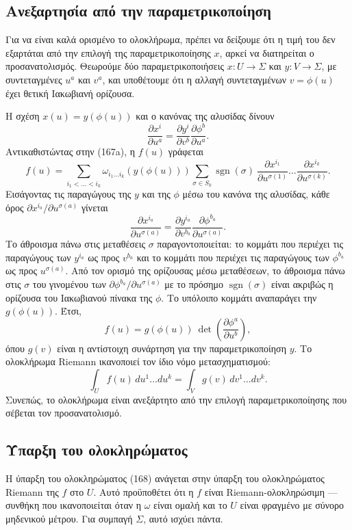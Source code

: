 \documentclass[12pt]{article}
\begin{document}
\subsection{Ανεξαρτησία από την παραμετρικοποίηση}

Για να είναι καλά ορισμένο το ολοκλήρωμα, πρέπει να δείξουμε ότι η τιμή του δεν εξαρτάται από την επιλογή της παραμετρικοποίησης $x$, αρκεί να διατηρείται ο προσανατολισμός. Θεωρούμε δύο παραμετρικοποιήσεις $x: U \to \Sigma$ και $y: V \to \Sigma$, με συντεταγμένες $u^a$ και $v^a$, και υποθέτουμε ότι η αλλαγή συντεταγμένων $v = \phi(u)$ έχει θετική Ιακωβιανή ορίζουσα.

Η σχέση $x(u) = y(\phi(u))$ και ο κανόνας της αλυσίδας δίνουν
\[
\frac{\partial x^i}{\partial u^a} = \frac{\partial y^i}{\partial v^b} \frac{\partial \phi^b}{\partial u^a}.
\]
Αντικαθιστώντας στην (167a), η $f(u)$ γράφεται
\[
f(u) = \sum_{i_1 < \dots < i_k} \omega_{i_1 \dots i_k}(y(\phi(u))) \sum_{\sigma \in S_k} \operatorname{sgn}(\sigma) \ \frac{\partial x^{i_1}}{\partial u^{\sigma(1)}} \dots \frac{\partial x^{i_k}}{\partial u^{\sigma(k)}}.
\]
Εισάγοντας τις παραγώγους της $y$ και της $\phi$ μέσω του κανόνα της αλυσίδας, κάθε όρος $\partial x^{i_a} / \partial u^{\sigma(a)}$ γίνεται
\[
\frac{\partial x^{i_a}}{\partial u^{\sigma(a)}} = \frac{\partial y^{i_a}}{\partial v^{b_a}} \frac{\partial \phi^{b_a}}{\partial u^{\sigma(a)}}.
\]
Το άθροισμα πάνω στις μεταθέσεις $\sigma$ παραγοντοποιείται: το κομμάτι που περιέχει τις παραγώγους των $y^{i_a}$ ως προς $v^{b_a}$ και το κομμάτι που περιέχει τις παραγώγους των $\phi^{b_a}$ ως προς $u^{\sigma(a)}$. Από τον ορισμό της ορίζουσας μέσω μεταθέσεων, το άθροισμα πάνω στις $\sigma$ του γινομένου των $\partial \phi^{b_a} / \partial u^{\sigma(a)}$ με το πρόσημο $\operatorname{sgn}(\sigma)$ είναι ακριβώς η ορίζουσα του Ιακωβιανού πίνακα της $\phi$. Το υπόλοιπο κομμάτι αναπαράγει την $g(\phi(u))$. Έτσι,
\[
f(u) = g(\phi(u)) \ \det \left( \frac{\partial \phi^a}{\partial u^b} \right),
\]
όπου $g(v)$ είναι η αντίστοιχη συνάρτηση για την παραμετρικοποίηση $y$. Το ολοκλήρωμα Riemann ικανοποιεί τον ίδιο νόμο μετασχηματισμού:
\[
\int_U f(u) \, du^1 \dots du^k = \int_V g(v) \, dv^1 \dots dv^k.
\]
Συνεπώς, το ολοκλήρωμα είναι ανεξάρτητο από την επιλογή παραμετρικοποίησης που σέβεται τον προσανατολισμό.

\subsection{Ύπαρξη του ολοκληρώματος}

Η ύπαρξη του ολοκληρώματος (168) ανάγεται στην ύπαρξη του ολοκληρώματος Riemann της $f$ στο $U$. Αυτό προϋποθέτει ότι η $f$ είναι Riemann-ολοκληρώσιμη — συνθήκη που ικανοποιείται όταν η $\omega$ είναι ομαλή και το $U$ είναι φραγμένο με σύνορο μηδενικού μέτρου. Για συμπαγή $\Sigma$, αυτό ισχύει πάντα.
\end{document}
